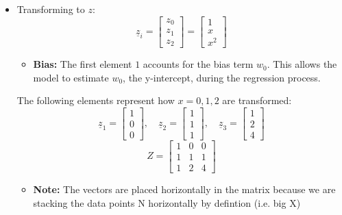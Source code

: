 \begin{example}
\begin{itemize}
                \item Transforming to $z$:
                \[
                \underline{z}_i = \begin{bmatrix} z_0 \\ z_1 \\ z_2 \end{bmatrix} = \begin{bmatrix} 1 \\ x \\ x^2 \end{bmatrix}
                \]
                \begin{itemize}
                    \item \textbf{Bias:} The first element \( 1 \) accounts for the bias term \( w_0 \). This allows the model to estimate \( w_0 \), the y-intercept, during the regression process.
                \end{itemize}
                \vspace{1em}

                The following elements represent how $x=0,1,2$ are transformed:
                \[
                \underline{z}_1 = \begin{bmatrix} 1 \\ 0 \\ 0 \end{bmatrix}, \quad
                \underline{z}_2 = \begin{bmatrix} 1 \\ 1 \\ 1 \end{bmatrix}, \quad
                \underline{z}_3 = \begin{bmatrix} 1 \\ 2 \\ 4 \end{bmatrix}
                \]
                \[
                Z = \begin{bmatrix} 
                1 & 0 & 0 \\ 
                1 & 1 & 1 \\ 
                1 & 2 & 4 
                \end{bmatrix}
                \]
                \begin{itemize}
                    \item \textbf{Note:} The vectors are placed horizontally in the matrix because we are stacking the data points N horizontally by defintion (i.e. big X)
                \end{itemize}


\end{itemize}
\end{example}
